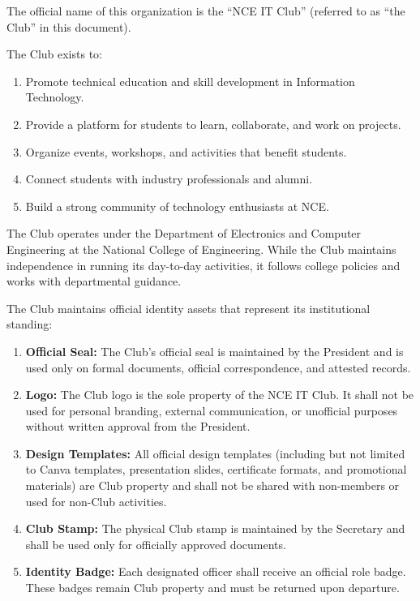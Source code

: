 

The official name of this organization is the ``NCE IT Club'' (referred to as ``the Club'' in this document).


The Club exists to:
\begin{enumerate}[label=\alph*), leftmargin=2em, itemsep=0.3em]
    \item Promote technical education and skill development in Information Technology.
    \item Provide a platform for students to learn, collaborate, and work on projects.
    \item Organize events, workshops, and activities that benefit students.
    \item Connect students with industry professionals and alumni.
    \item Build a strong community of technology enthusiasts at NCE.
\end{enumerate}


The Club operates under the Department of Electronics and Computer Engineering at the National College of Engineering. While the Club maintains independence in running its day-to-day activities, it follows college policies and works with departmental guidance.


The Club maintains official identity assets that represent its institutional standing:
\begin{enumerate}[label=\alph*), leftmargin=2em, itemsep=0.3em]
    \item \textbf{Official Seal:} The Club's official seal is maintained by the President and is used only on formal documents, official correspondence, and attested records.
    \item \textbf{Logo:} The Club logo is the sole property of the NCE IT Club. It shall not be used for personal branding, external communication, or unofficial purposes without written approval from the President.
    \item \textbf{Design Templates:} All official design templates (including but not limited to Canva templates, presentation slides, certificate formats, and promotional materials) are Club property and shall not be shared with non-members or used for non-Club activities.
    \item \textbf{Club Stamp:} The physical Club stamp is maintained by the Secretary and shall be used only for officially approved documents.
    \item \textbf{Identity Badge:} Each designated officer shall receive an official role badge. These badges remain Club property and must be returned upon departure.
\end{enumerate}

